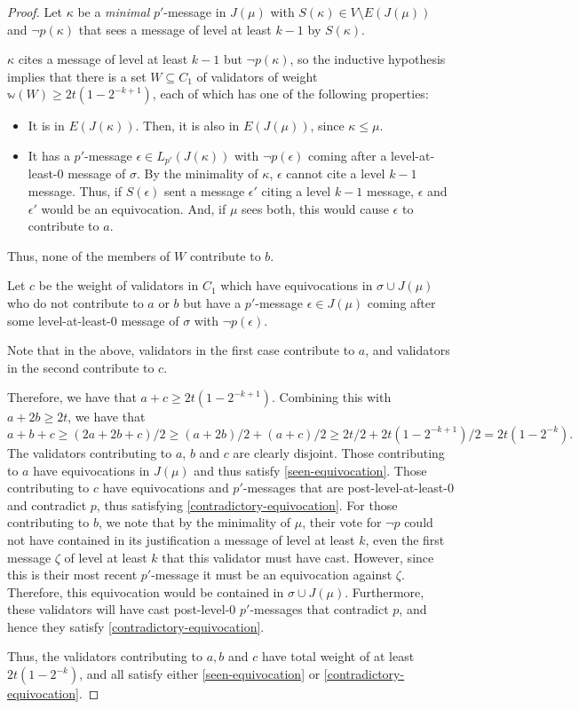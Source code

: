 \documentclass[12pt]{article}
\begin{document}
\begin{proof}
  Let $\kappa$ be a \emph{minimal} $p'$-message in $J(\mu)$ with $S(\kappa) \in V \setminus E(J(\mu))$ and $\neg p(\kappa)$ that sees a message of level at least $k - 1$ by $S(\kappa)$.

  $\kappa$ cites a message of level at least $k-1$ but $\neg p(\kappa)$, so the inductive hypothesis implies that there is a set $W \subseteq C_1$ of validators of weight $\mathbb{w}(W) \geq 2t(1-2^{-k+1})$, each of which has one of the following properties:
  \begin{itemize}
    \item It is in $E(J(\kappa))$. Then, it is also in $E(J(\mu))$, since $\kappa \leq \mu$.
    \item It has a $p'$-message $\epsilon \in L_{p'}(J(\kappa))$ with $\neg p(\epsilon)$ coming after a level-at-least-0 message of $\sigma$. By the minimality of $\kappa$, $\epsilon$ cannot cite a level $k-1$ message. Thus, if $S(\epsilon)$ sent a message $\epsilon'$ citing a level $k-1$ message, $\epsilon$ and $\epsilon'$ would be an equivocation. And, if $\mu$ sees both, this would cause $\epsilon$ to contribute to $a$.
  \end{itemize}
Thus, none of the members of $W$ contribute to $b$.

Let $c$ be the weight of validators in $C_1$ which have equivocations in $\sigma \cup J(\mu)$ who do not contribute to $a$ or $b$ but have a $p'$-message $\epsilon\in J(\mu)$ coming after some level-at-least-0 message of $\sigma$ with $\neg p(\epsilon)$. 

Note that in the above, validators in the first case contribute to $a$, and validators in the second contribute to $c$.

Therefore, we have that $a+c\geq 2t(1-2^{-k+1}).$ Combining this with $a+2b\geq 2t$, we have that
$$
a+b+c \geq (2a+2b+c)/2 \geq (a+2b)/2+(a+c)/2 \geq 2t/2 + 2t(1-2^{-k+1})/2 = 2t(1-2^{-k})\text{.}
$$
The validators contributing to $a$, $b$ and $c$ are clearly disjoint. Those contributing to $a$ have equivocations in $J(\mu)$ and thus satisfy \ref{seen-equivocation}. Those contributing to $c$ have equivocations and $p'$-messages that are post-level-at-least-0 and contradict $p$, thus satisfying \ref{contradictory-equivocation}. For those contributing to $b$, we note that by the minimality of $\mu$, their vote for $\neg p$ could not have contained in its justification a message of level at least $k$, even the first message $\zeta$ of level at least $k$ that this validator must have cast. However, since this is their most recent $p'$-message it must be an equivocation against $\zeta$. Therefore, this equivocation would be contained in $\sigma \cup J(\mu)$. Furthermore, these validators will have cast post-level-0 $p'$-messages that contradict $p$, and hence they satisfy \ref{contradictory-equivocation}.

Thus, the validators contributing to $a,b$ and $c$ have total weight of at least $2t(1-2^{-k})$, and all satisfy either \ref{seen-equivocation} or \ref{contradictory-equivocation}.
\end{proof}
\end{document}
